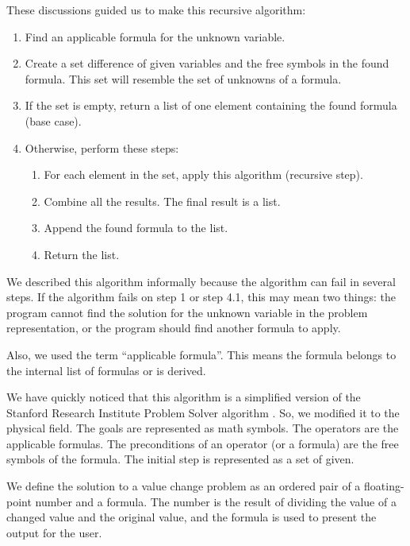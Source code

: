 \documentclass[a4paper, 12pt]{article}
\begin{document}
	These discussions guided us to make this recursive algorithm:
	
	\begin{enumerate}
	\item
	  Find an applicable formula for the unknown variable.
	\item
	  Create a set difference of given variables and the free symbols in the
	  found formula. This set will resemble the set of unknowns of a
	  formula.
	\item
	  If the set is empty, return a list of one element containing the found
	  formula (base case).
	\item
	  Otherwise, perform these steps:
	
	  \begin{enumerate}
	  \item
	    For each element in the set, apply this algorithm (recursive step).
	  \item
	    Combine all the results. The final result is a list.
	  \item
	    Append the found formula to the list.
	  \item
	    Return the list.
	  \end{enumerate}
	\end{enumerate}
	
	We described this algorithm informally because the algorithm can fail in
	several steps. If the algorithm fails on step 1 or step 4.1, this may
	mean two things: the program cannot find the solution for the unknown
	variable in the problem representation, or the program should find
	another formula to apply.
	
	Also, we used the term \enquote{applicable formula}. This means the formula
	belongs to the internal list of formulas or is derived.
	
	We have quickly noticed that this algorithm is a simplified version of
	the Stanford Research Institute Problem Solver algorithm \cite{strips}. So,
	we modified it to the physical field. The goals are represented as math
	symbols. The operators are the applicable formulas. The preconditions of
	an operator (or a formula) are the free symbols of the formula. The
	initial step is represented as a set of given.
	
	We define the solution to a value change problem as an ordered pair of a
	floating-point number and a formula. The number is the result of
	dividing the value of a changed value and the original value, and the
	formula is used to present the output for the user.
	
\end{document}
